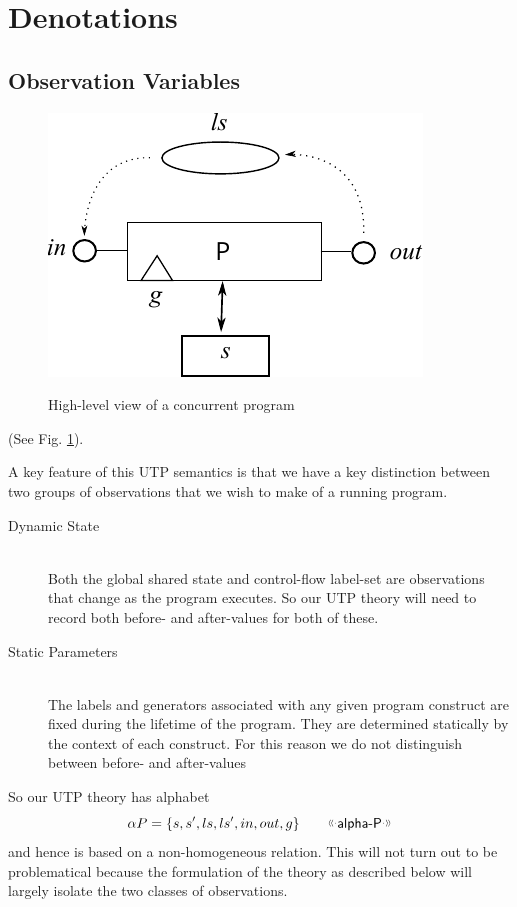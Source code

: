\section{Denotations}\label{sec:denote}

\subsection{Observation Variables}

\begin{figure}
  \centering
  \includegraphics{images/parallel-program}\\
  \caption{High-level view of a concurrent program}
  \label{fig:high-level-prog}
\end{figure}
(See Fig. \ref{fig:high-level-prog}).

A key feature of this UTP semantics is that we have a key distinction
between two groups of observations that we wish to make of a running program.
\begin{description}
  \item[Dynamic State]~\\
    Both the global shared state and control-flow label-set
    are observations that change as the program executes.
    So our UTP theory will need to record both before- and after-values
    for both of these.
  \item[Static Parameters]~\\
    The labels and generators associated with any given program
    construct are fixed during the lifetime of the program.
    They are determined statically by the context of each construct.
    For this reason we do not distinguish between before- and after-values
\end{description}
So our UTP theory has alphabet
\[
  \alpha P  = \setof{s,s',ls,ls',in,out,g}
  \qquad
  \elabel{alpha-P}
\]
and hence is based on a non-homogeneous relation.
This will not turn out to be problematical because
the formulation of the theory as described below will largely isolate the
two classes of observations.



